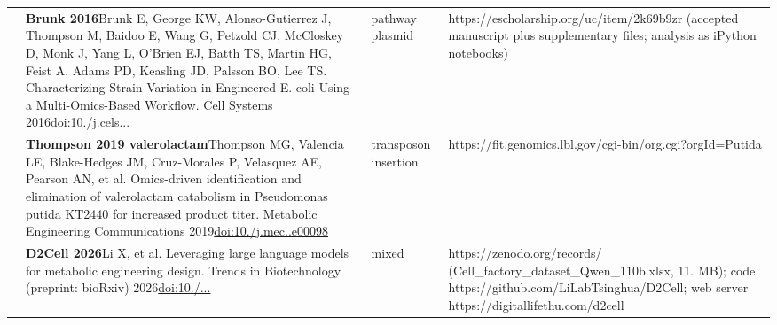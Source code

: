 \begin{landscape}
\begin{longtable}{@{}r@{\hspace{4pt}} L{86mm} L{74mm} L{78mm}@{}}
 & \textbf{Brunk 2016}\newline Brunk E, George KW, Alonso-Gutierrez J, Thompson M, Baidoo E, Wang G, Petzold CJ, McCloskey D, Monk J, Yang L, O'Brien EJ, Batth TS, Martin HG, Feist A, Adams PD, Keasling JD, Palsson BO, Lee TS. Characterizing Strain Variation in Engineered E. coli Using a Multi-Omics-Based Workflow. Cell Systems 2016\newline \href{https://doi.org/10.1016/j.cels.2016.04.004}{doi:10./\allowbreak j.\allowbreak cels...} & pathway plasmid & https:/\allowbreak /\allowbreak escholarship.\allowbreak org/\allowbreak uc/\allowbreak item/\allowbreak 2k69b9zr (accepted manuscript plus supplementary files; analysis as iPython notebooks) \\
 & \textbf{Thompson 2019 valerolactam}\newline Thompson MG, Valencia LE, Blake-Hedges JM, Cruz-Morales P, Velasquez AE, Pearson AN, et al. Omics-driven identification and elimination of valerolactam catabolism in Pseudomonas putida KT2440 for increased product titer. Metabolic Engineering Communications 2019\newline \href{https://doi.org/10.1016/j.mec.2019.e00098}{doi:10./\allowbreak j.\allowbreak mec..\allowbreak e00098} & transposon insertion & https:/\allowbreak /\allowbreak fit.\allowbreak genomics.\allowbreak lbl.\allowbreak gov/\allowbreak cgi-\allowbreak bin/\allowbreak org.\allowbreak cgi?orgId=Putida \\
 & \textbf{D2Cell 2026}\newline Li X, et al. Leveraging large language models for metabolic engineering design. Trends in Biotechnology (preprint: bioRxiv) 2026\newline \href{https://doi.org/10.1101/2024.09.09.612023}{doi:10./...} & mixed & https:/\allowbreak /\allowbreak zenodo.\allowbreak org/\allowbreak records/ (Cell\_\allowbreak factory\_\allowbreak dataset\_\allowbreak Qwen\_\allowbreak 110b.\allowbreak xlsx, 11. MB); code https:/\allowbreak /\allowbreak github.\allowbreak com/\allowbreak LiLabTsinghua/\allowbreak D2Cell; web server https:/\allowbreak /\allowbreak digitallifethu.\allowbreak com/\allowbreak d2cell \\

\end{longtable}
\end{landscape}

